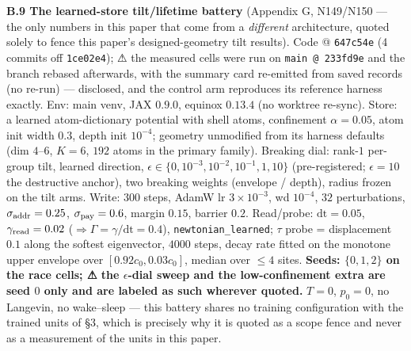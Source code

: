 \documentclass[10pt]{article}
\begin{document}
\medskip
\textbf{B.9 The learned-store tilt/lifetime battery} (Appendix G, N149/N150 --- the only numbers in this paper that come from a \emph{different} architecture, quoted solely to fence this paper's designed-geometry tilt results). Code @ \texttt{647c54e} (4 commits off \texttt{1ce02e4}); ⚠ the measured cells were run on \texttt{main @ 233fd9e} and the branch rebased afterwards, with the summary card re-emitted from saved records (no re-run) --- disclosed, and the control arm reproduces its reference harness exactly. Env: main venv, JAX $0.9.0$, equinox $0.13.4$ (no worktree re-sync). Store: a learned atom-dictionary potential with shell atoms, confinement $\alpha=0.05$, atom init width $0.3$, depth init $10^{-4}$; geometry unmodified from its harness defaults (dim $4$--$6$, $K=6$, $192$ atoms in the primary family). Breaking dial: rank-$1$ per-group tilt, learned direction, $\epsilon\in\{0,10^{-3},10^{-2},10^{-1},1,10\}$ (pre-registered; $\epsilon=10$ the destructive anchor), two breaking weights (envelope / depth), radius frozen on the tilt arms. Write: $300$ steps, AdamW lr $3\!\times\!10^{-3}$, wd $10^{-4}$, $32$ perturbations, $\sigma_{\rm addr}=0.25$, $\sigma_{\rm pay}=0.6$, margin $0.15$, barrier $0.2$. Read/probe: $\mathrm{dt}=0.05$, $\gamma_{\rm read}=0.02$ ($\Rightarrow\Gamma=\gamma/\mathrm{dt}=0.4$), \texttt{newtonian\_learned}; $\tau$ probe = displacement $0.1$ along the softest eigenvector, $4000$ steps, decay rate fitted on the monotone upper envelope over $[0.92c_0,0.03c_0]$, median over $\le4$ sites. \textbf{Seeds: $\{0,1,2\}$ on the race cells; ⚠ the $\epsilon$-dial sweep and the low-confinement extra are seed $0$ only and are labeled as such wherever quoted.} $T=0$, $p_0=0$, no Langevin, no wake--sleep --- this battery shares no training configuration with the trained units of \S3, which is precisely why it is quoted as a scope fence and never as a measurement of the units in this paper.
\end{document}
